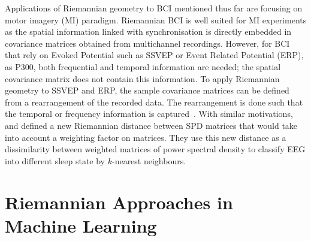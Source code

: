 {%

Applications of Riemannian geometry to BCI mentioned thus far are focusing on motor imagery (MI) paradigm.
Riemannian BCI is well suited for MI experiments as the spatial information linked with synchronisation is directly embedded in covariance matrices obtained from multichannel recordings.
However, for BCI that rely on Evoked Potential such as SSVEP or Event Related Potential (ERP), as P300, both frequential and temporal information are needed; the spatial covariance matrix does not contain this information. 
To apply Riemannian geometry to SSVEP and ERP, the sample covariance matrices can be defined from a rearrangement of the recorded data. 
The rearrangement is done such that the temporal or frequency information is captured~\citep{congedo2013new}. 
With similar motivations, \cite{li2009eeg} and \cite{li2012electroencephalogram} defined a new Riemannian distance between SPD matrices that would take into account a weighting factor on matrices. 
They use this new distance as a dissimilarity between weighted matrices of power spectral density to classify EEG into different sleep state by $k$-nearest neighbours. 
}





\section{Riemannian Approaches in Machine Learning}
\label{sec:riemann_approach}



